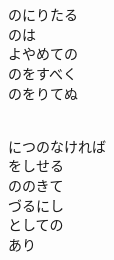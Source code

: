 \documentclass[10pt,b5j]{tarticle} %
\begin{document}
\vspace{1.5em} %
\newcommand{\linespace}{0.5em} %
\newcommand{\blocksize}{0.5\hsize} %
\newcommand{\itemmargin}{3em} %
\begin{enumerate} %
    \setlength{\itemindent}{\itemmargin} %
    \begin{minipage}[c]{\blocksize}
    
        \vspace{\linespace}
        \item~\\
        \\
        のにりたる\\
        のは\\
        よやめての\\
        のをすべく\\
        のをりてぬ
        
    \end{minipage}
    \begin{minipage}[c]{\blocksize}
        
        \vspace{\linespace}
        \item~\\
        につのなければ\\
        をしせる\\
        ののきて\\
        づるにし\\
        としての\\
        あり
        
    \end{minipage}
    \begin{minipage}[c]{\blocksize}
        

\end{minipage}
\end{enumerate}
\end{document}
